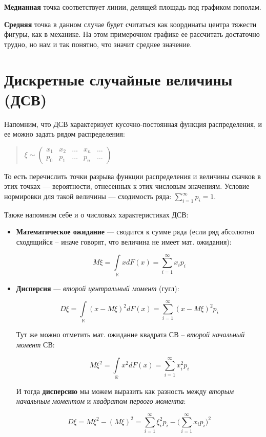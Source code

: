 \documentclass{article}
\begin{document}
\textbf{Медианная} точка соответствует линии, делящей площадь под графиком пополам.

\textbf{Средняя} точка в данном случае будет считаться как координаты центра тяжести фигуры, как в механике. На этом примерочном графике ее рассчитать достаточно трудно, но нам и так понятно, что значит среднее значение.

\section{Дискретные случайные величины (ДСВ)}

Напомним, что ДСВ характеризует кусочно-постоянная функция распределения, и ее можно задать рядом распределения:

\begin{quote}
$\xi \sim
\begin{pmatrix}
x_1 & x_2 & \ldots & x_n & \ldots\\
p_0 & p_1 & \ldots & p_n & \ldots
\end{pmatrix}$
\end{quote}


То есть перечислить точки разрыва функции распределения и величины скачков в этих точках --- вероятности, отнесенных к этих числовым значениям. Условие нормировки для такой величины --- сходимость ряда: $\sum\limits_{i = 1}^\infty p_i = 1$.

Также напомним себе и о числовых характеристиках ДСВ:

\begin{itemize}
\item \textbf{Математическое ожидание} --- сводится к сумме ряда (если ряд абсолютно сходящийся -- иначе говорят, что величина не имеет мат. ожидания):

$$M\xi = \int\limits_\mathbb{R} xdF(x) =
\sum\limits_{i = 1}^\infty x_i p_i$$

\item \textbf{Дисперсия} --- \textit{второй центральный момент} (гугл):

$$D\xi = \int\limits_\mathbb{R} (x - M\xi)^2 dF(x) =
\sum\limits_{i = 1}^\infty(x - M\xi)^2 p_i$$

Тут же можно отметить мат. ожидание квадрата СВ -- \textit{второй начальный момент} СВ:

$$M\xi^2 = \int\limits_\mathbb{R}x^2dF(x) = \sum\limits_{i = 1}^\infty x_i^2p_i$$

И тогда \textbf{дисперсию} мы можем выразить как разность между \textit{вторым начальным моментом} и \textit{квадратом первого момента}:

$$D\xi = M\xi^2 - (M\xi)^2 = \sum\limits_{i = 1}^{\infty} \xi_i^2 p_i -
\Biggl(\sum\limits_{i = 1}^{\infty} x_i p_i\Biggr)^2$$
\\
\end{itemize}
\end{document}
